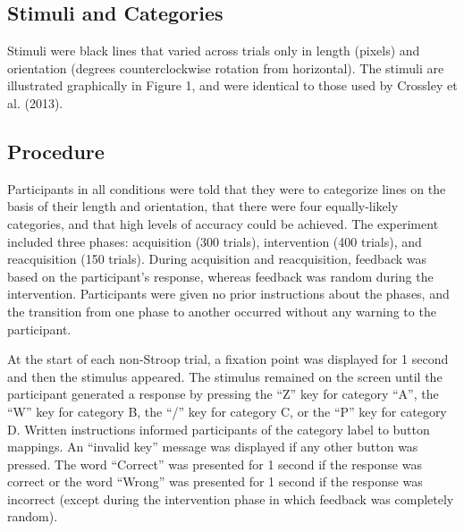 \documentclass[apacite,draftfirst,man]{apa6}
\begin{document}
\subsection*{Stimuli and Categories}
Stimuli were black lines that varied across trials only in length (pixels) and
orientation (degrees counterclockwise rotation from horizontal). The stimuli are
illustrated graphically in Figure 1, and were identical to those used by
Crossley et al. (2013).

\subsection{Procedure}
Participants in all conditions were told that they were to categorize lines on
the basis of their length and orientation, that there were four equally-likely
categories, and that high levels of accuracy could be achieved. The experiment
included three phases: acquisition (300 trials), intervention (400 trials), and
reacquisition (150 trials). During acquisition and reacquisition, feedback was
based on the participant's response, whereas feedback was random during the
intervention. Participants were given no prior instructions about the phases,
and the transition from one phase to another occurred without any warning to the
participant.

At the start of each non-Stroop trial, a fixation point was displayed for 1
second and then the stimulus appeared. The stimulus remained on the screen until
the participant generated a response by pressing the ``Z'' key for category
``A'', the ``W'' key for category B, the ``/'' key for category C, or the ``P''
key for category D. Written instructions informed participants of the category
label to button mappings. An ``invalid key'' message was displayed if any other
button was pressed. The word ``Correct'' was presented for 1 second if the
response was correct or the word ``Wrong'' was presented for 1 second if the
response was incorrect (except during the intervention phase in which feedback
was completely random).
\end{document}

